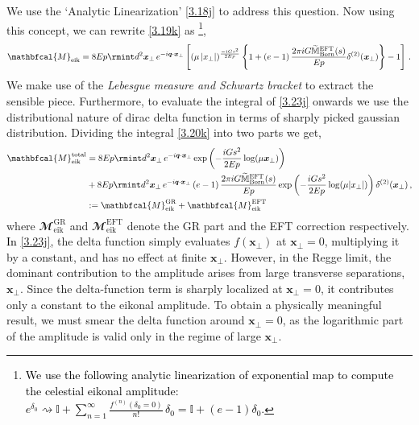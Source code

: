 We use the `Analytic Linearization' \eqref{3.18j} to address this question. Now using this concept, we can rewrite \eqref{3.19k} as \footnote{\textcolor{black}{We use the following analytic linearization of exponential map to compute the celestial eikonal amplitude: $  e^{\delta_0}\rightsquigarrow\mathbb{I} + \sum_{n=1}^\infty \frac{f^{(n)}(\delta_0=0)}{n!}\, \delta_0=\mathbb{I}+(e-1)\delta_0.$}},
\begin{align}
    \begin{split}
        \mathbfcal{M}_{\textrm{eik}}= 8Ep\rmint d^2 \boldsymbol{x}_{\perp}\,e^{-i \boldsymbol{q}\cdot \boldsymbol{x}_{\perp}}\left[(\mu\,|{x}_{\perp}|)^{\frac{-i G s^2}{2Ep}}\left\{1+\left(e-1\right){\frac{2\pi i G \widetilde{\mathbb{M}}^{\textrm{EFT}}_{\textrm{Born}}(s)}{Ep}}\delta^{(2)}(\boldsymbol{x}_{\perp})\right\}-1\right]\,.\label{3.20k}
    \end{split}
\end{align}
We make use of the \textit{Lebesgue measure and Schwartz bracket} \cite{Borji:2024pvg} to extract the sensible piece.
\noindent
Furthermore, to evaluate the integral of \eqref{3.23j} onwards we use the distributional nature of dirac delta function in terms of sharply picked gaussian distribution. Dividing the integral \eqref{3.20k} into two parts we get,
\begin{align}
    \begin{split}
         \mathbfcal{M}^{\textrm{total}}_{\textrm{eik}} & = 8Ep\rmint d^2 \boldsymbol{x}_{\perp}\,e^{-i \boldsymbol{q}\cdot \boldsymbol{x}_{\perp}}\exp\left(-\frac{iGs^2}{2Ep}\log(\mu \boldsymbol{x}_{\perp})\right)\\ & +8Ep \rmint d^2 \boldsymbol{x}_{\perp}\,e^{-i \boldsymbol{q}\cdot \boldsymbol{x}_{\perp}}\left(e-1\right){\frac{2\pi i G \widetilde{\mathbb{M}}^{\textrm{EFT}}_{\textrm{Born}}(s)}{Ep}}\exp\left(-\frac{iGs^2}{2Ep}\log(\mu |{x}_{\perp}|)\right)\delta^{(2)}(\boldsymbol{x}_{\perp})\,,\\ &
         :=\mathbfcal{M}^{\textrm{GR}}_{\textrm{eik}}+\mathbfcal{M}^{\textrm{EFT}}_{\textrm{eik}}
         \label{3.23j}
    \end{split}
\end{align}
where $\mathbfcal{M}^{\textrm{GR}}_{\textrm{eik}}$ and $\mathbfcal{M}^{\textrm{EFT}}_{\textrm{eik}}$ denote the GR part and the EFT correction respectively.
\textcolor{black}{In \eqref{3.23j}}, the delta function simply evaluates \( f(\boldsymbol{x}_{\perp}) \) at \( \boldsymbol{x}_{\perp} = 0 \), multiplying it by a constant, and has no effect at finite \( \boldsymbol{x}_{\perp} \). However, in the Regge limit, the dominant contribution to the amplitude arises from large transverse separations, \( \boldsymbol{x}_{\perp} \). Since the delta-function term is sharply localized at \( \boldsymbol{x}_{\perp} = 0 \), it contributes only a constant to the eikonal amplitude. To obtain a physically meaningful result, we must smear the delta function around \( \boldsymbol{x}_{\perp} = 0 \), as the logarithmic part of the amplitude is valid only in the regime of large \( \boldsymbol{x}_{\perp} \).

